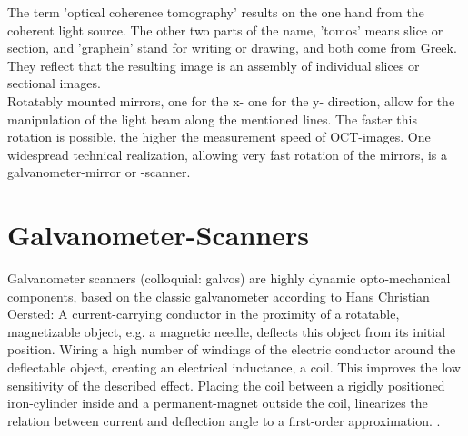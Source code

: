 The term 'optical coherence tomography' results on the one hand from the coherent light source. The other two parts of the name, 'tomos' means slice or section, and 'graphein' stand for writing or drawing, and both come from Greek. They reflect that the resulting image is an assembly of individual slices or sectional images. \\
Rotatably mounted mirrors, one for the x- one for the y- direction, allow for the manipulation of the light beam along the mentioned lines. The faster this rotation is possible, the higher the measurement speed of OCT-images. One widespread technical realization, allowing very fast rotation of the mirrors, is a galvanometer-mirror or -scanner.


\section{Galvanometer-Scanners}
Galvanometer scanners (colloquial: galvos) are highly dynamic opto-mechanical components, based on the classic galvanometer according to Hans Christian Oersted: A current-carrying conductor in the proximity of a rotatable, magnetizable object, e.g. a magnetic needle, deflects this object from its initial position. Wiring a high number of windings of the electric conductor around the deflectable object, creating an electrical inductance, a coil. This improves the low sensitivity of the described effect. Placing the coil between a rigidly positioned iron-cylinder inside and a permanent-magnet outside the coil, linearizes the relation between current and deflection angle to a first-order approximation.
\cite{keithleyHistory}. 
